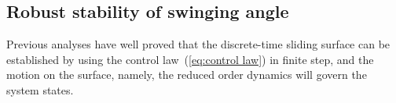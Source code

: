 \documentclass[10pt,onecolumn,draftcls]{IEEEtran}
\newcommand\sgn{{\rm sgn}}
\begin{document}
	\subsection{Robust stability of swinging angle}\label{subsec:rssa}
	Previous analyses have well proved that the discrete-time sliding surface can be established by using the control law~(\ref{eq:control law}) in finite step, and the motion on the surface, namely, the reduced order  dynamics will govern the system states. 
	
\end{document}
